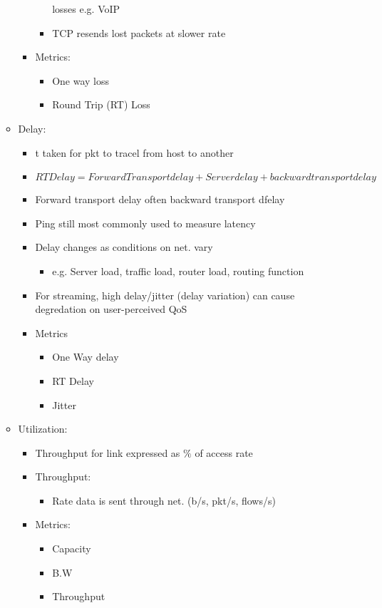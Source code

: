 \documentclass[a4paper]{article}
\begin{document}
\begin{itemize}
\begin{itemize}
\begin{itemize}
\begin{itemize}
					losses e.g. VoIP
				\item TCP resends lost packets at slower rate
			\end{itemize}
			\item Metrics:
			\begin{itemize}
				\item One way loss
				\item Round Trip (RT) Loss
			\end{itemize}
		\end{itemize}
		\item Delay:
		\begin{itemize}
			\item t taken for pkt to tracel from host to another
			\item $RT Delay = Forward Transport delay + Server delay
				+ backward transport delay$
			\item Forward transport delay often \neq backward
				transport dfelay
			\item Ping still most commonly used to measure latency
			\item Delay changes as conditions on net. vary
			\begin{itemize}
				\item e.g. Server load, traffic load, router
					load, routing function
			\end{itemize}
			\item For streaming, high delay/jitter (delay variation)
				can cause degredation on user-perceived QoS
			\item Metrics
			\begin{itemize}
				\item One Way delay
				\item RT Delay
				\item Jitter
			\end{itemize}
		\end{itemize}
		\item Utilization:
		\begin{itemize}
			\item Throughput for link expressed as $\%$ of access
				rate
			\item Throughput:
			\begin{itemize}
				\item Rate data is sent through net. (b/s,
					pkt/s, flows/s)
			\end{itemize}
			\item Metrics:
			\begin{itemize}
				\item Capacity
				\item B.W
				\item Throughput
			\end{itemize}
		\end{itemize}
	\end{itemize}
\end{itemize}
\end{document}
